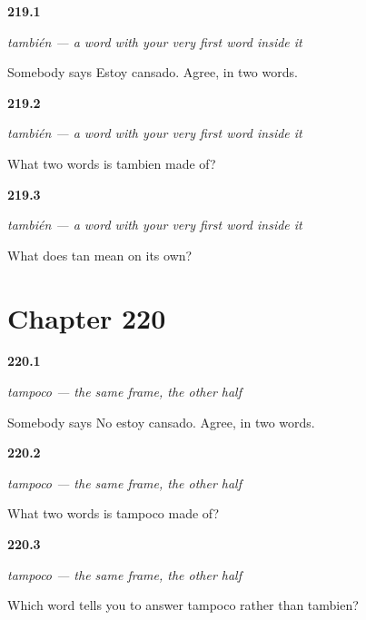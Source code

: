 \noindent\begin{minipage}[t]{\linewidth}
\raggedright
\hypertarget{review-ES-C58-tambien-agree}{\textbf{219.1}} \emph{también — a word with your very first word inside it}\par
\small Somebody says Estoy cansado. Agree, in two words.
\end{minipage}\par\medskip

\noindent\begin{minipage}[t]{\linewidth}
\raggedright
\hypertarget{review-ES-C58-tambien-parts}{\textbf{219.2}} \emph{también — a word with your very first word inside it}\par
\small What two words is tambien made of?
\end{minipage}\par\medskip

\noindent\begin{minipage}[t]{\linewidth}
\raggedright
\hypertarget{review-ES-C58-tambien-tan}{\textbf{219.3}} \emph{también — a word with your very first word inside it}\par
\small What does tan mean on its own?
\end{minipage}\par\medskip

\section*{Chapter 220}

\noindent\begin{minipage}[t]{\linewidth}
\raggedright
\hypertarget{review-ES-C58-tampoco-agree}{\textbf{220.1}} \emph{tampoco — the same frame, the other half}\par
\small Somebody says No estoy cansado. Agree, in two words.
\end{minipage}\par\medskip

\noindent\begin{minipage}[t]{\linewidth}
\raggedright
\hypertarget{review-ES-C58-tampoco-parts}{\textbf{220.2}} \emph{tampoco — the same frame, the other half}\par
\small What two words is tampoco made of?
\end{minipage}\par\medskip

\noindent\begin{minipage}[t]{\linewidth}
\raggedright
\hypertarget{review-ES-C58-tampoco-choose}{\textbf{220.3}} \emph{tampoco — the same frame, the other half}\par
\small Which word tells you to answer tampoco rather than tambien?
\end{minipage}\par\medskip

